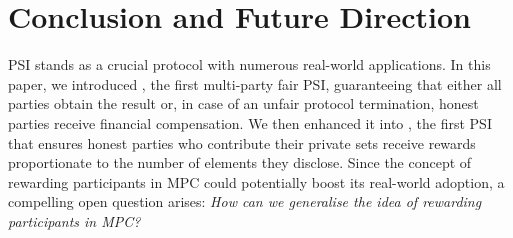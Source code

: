 
\vspace{-4mm}
\section{Conclusion and Future Direction}\label{sec::concl}
\vspace{-2mm}


PSI stands as a crucial protocol with numerous real-world applications. In this paper, we introduced \withFai, the first multi-party fair PSI, guaranteeing that either all parties obtain the result or, in case of an unfair protocol termination, honest parties receive financial compensation. We then enhanced it into \withRew, the first PSI that ensures honest parties who contribute their private sets receive rewards proportionate to the number of elements they disclose. 
%
Since the concept of rewarding participants in MPC could potentially boost its real-world adoption, a compelling open question arises: \textit{How can we generalise the idea of rewarding participants in MPC?}


